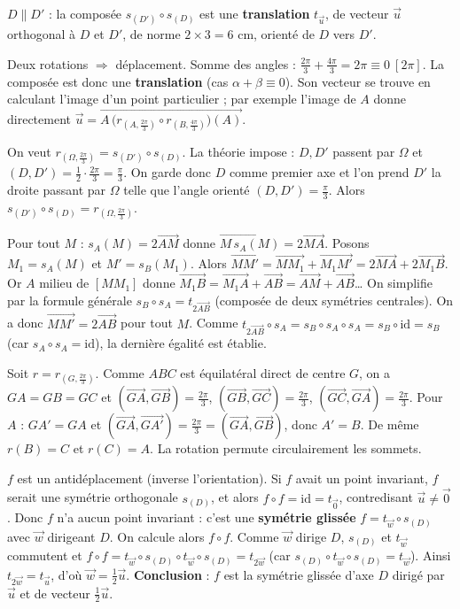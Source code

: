 $D\parallel D'$ : la composée $s_{(D')}\circ s_{(D)}$ est une \textbf{translation} $t_{\vec u}$, de vecteur $\vec u$ orthogonal à $D$ et $D'$, de norme $2\times 3=6$ cm, orienté de $D$ vers $D'$.

Deux rotations $\Rightarrow$ déplacement. Somme des angles : $\frac{2\pi}{3}+\frac{4\pi}{3}=2\pi\equiv0\ [2\pi]$. La composée est donc une \textbf{translation} (cas $\alpha+\beta\equiv0$). Son vecteur se trouve en calculant l'image d'un point particulier ; par exemple l'image de $A$ donne directement $\vec u=\overrightarrow{A\,\big(r_{(A,\frac{2\pi}3)}\circ r_{(B,\frac{4\pi}3)}\big)(A)}$.

On veut $r_{(\Omega,\frac{2\pi}{3})}=s_{(D')}\circ s_{(D)}$. La théorie impose : $D,D'$ passent par $\Omega$ et $(D,D')=\frac12\cdot\frac{2\pi}{3}=\frac\pi3$. On garde donc $D$ comme premier axe et l'on prend $D'$ la droite passant par $\Omega$ telle que l'angle orienté $(D,D')=\frac\pi3$. Alors $s_{(D')}\circ s_{(D)}=r_{(\Omega,\frac{2\pi}3)}$.

Pour tout $M$ : $s_A(M)=2\overrightarrow{AM}$ donne $\overrightarrow{M\,s_A(M)}=2\overrightarrow{MA}$. Posons $M_1=s_A(M)$ et $M'=s_B(M_1)$. Alors $\overrightarrow{MM'}=\overrightarrow{MM_1}+\overrightarrow{M_1M'}=2\overrightarrow{MA}+2\overrightarrow{M_1 B}$. Or $A$ milieu de $[MM_1]$ donne $\overrightarrow{M_1 B}=\overrightarrow{M_1 A}+\overrightarrow{AB}=\overrightarrow{AM}+\overrightarrow{AB}$… On simplifie par la formule générale $s_B\circ s_A=t_{2\overrightarrow{AB}}$ (composée de deux symétries centrales). On a donc $\overrightarrow{MM'}=2\overrightarrow{AB}$ pour tout $M$. Comme $t_{2\overrightarrow{AB}}\circ s_A=s_B\circ s_A\circ s_A=s_B\circ\mathrm{id}=s_B$ (car $s_A\circ s_A=\mathrm{id}$), la dernière égalité est établie.

Soit $r=r_{(G,\frac{2\pi}{3})}$. Comme $ABC$ est équilatéral direct de centre $G$, on a $GA=GB=GC$ et $(\overrightarrow{GA},\overrightarrow{GB})=\frac{2\pi}{3}$, $(\overrightarrow{GB},\overrightarrow{GC})=\frac{2\pi}{3}$, $(\overrightarrow{GC},\overrightarrow{GA})=\frac{2\pi}{3}$. Pour $A$ : $GA'=GA$ et $(\overrightarrow{GA},\overrightarrow{GA'})=\frac{2\pi}{3}=(\overrightarrow{GA},\overrightarrow{GB})$, donc $A'=B$. De même $r(B)=C$ et $r(C)=A$. La rotation permute circulairement les sommets.

$f$ est un antidéplacement (inverse l'orientation). Si $f$ avait un point invariant, $f$ serait une symétrie orthogonale $s_{(D)}$, et alors $f\circ f=\mathrm{id}=t_{\vec0}$, contredisant $\vec u\neq\vec0$. Donc $f$ n'a aucun point invariant : c'est une \textbf{symétrie glissée} $f=t_{\vec w}\circ s_{(D)}$ avec $\vec w$ dirigeant $D$. On calcule alors $f\circ f$. Comme $\vec w$ dirige $D$, $s_{(D)}$ et $t_{\vec w}$ commutent et $f\circ f=t_{\vec w}\circ s_{(D)}\circ t_{\vec w}\circ s_{(D)}=t_{2\vec w}$ (car $s_{(D)}\circ t_{\vec w}\circ s_{(D)}=t_{\vec w}$). Ainsi $t_{2\vec w}=t_{\vec u}$, d'où $\vec w=\tfrac12\vec u$. \textbf{Conclusion} : $f$ est la symétrie glissée d'axe $D$ dirigé par $\vec u$ et de vecteur $\tfrac12\vec u$.

